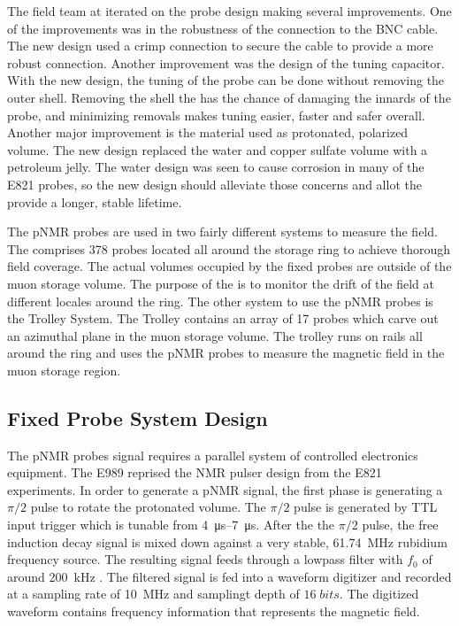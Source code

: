
The field team at \uw iterated on the probe design making several improvements.  One of the improvements was in the robustness of the connection to the BNC cable.  The new design used a crimp connection to secure the cable to provide a more robust connection.  Another improvement was the design of the tuning capacitor.  With the new design, the tuning of the probe can be done without removing the outer shell.  Removing the shell the has the chance of damaging the innards of the probe, and minimizing removals makes tuning easier, faster and safer overall.  Another major improvement is the material used as protonated, polarized volume.  The new design replaced the water and copper sulfate volume with a petroleum jelly.  The water design was seen to cause corrosion in many of the E821 probes, so the new design should alleviate those concerns and allot the provide a longer, stable lifetime.



The pNMR probes are used in two fairly different systems to measure the field.  The \fps comprises 378 probes located all around the storage ring to achieve thorough field coverage.  The actual volumes occupied by the fixed probes are outside of the muon storage volume.  The purpose of the \fps is to monitor the drift of the field at different locales around the ring.  The other system to use the pNMR probes is the Trolley System. The Trolley contains an array of 17 probes which carve out an azimuthal plane in the muon storage volume.  The trolley runs on rails all around the ring and uses the pNMR probes to measure the magnetic field in the muon storage region.  

\subsection{Fixed Probe System Design}

The pNMR probes signal requires a parallel system of controlled electronics equipment.  The E989 reprised the NMR pulser design from the E821 experiments.  In order to generate a pNMR signal, the first phase is generating a $\pi/2$ pulse to rotate the protonated volume.  The $\pi/2$ pulse is generated by TTL input trigger which is tunable from \SIrange{4}{7}{\micro\second}.  After the the $\pi/2$ pulse, the free induction decay signal is mixed down against a very stable, \SI{61.74}{\MHz} rubidium frequency source.  The resulting signal feeds through a lowpass filter with $f_0$ of around \SI{200}{\kHz} .  The filtered signal is fed into a waveform digitizer and recorded at a sampling rate of \SI{10}{\MHz} and samplingt depth of $16\;bits$.  The digitized waveform contains frequency information that represents the magnetic field.

